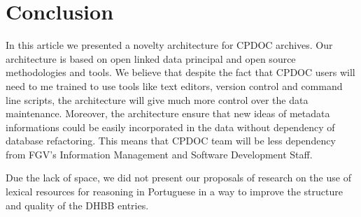 \documentclass{llncs}
\begin{document}


\section{Conclusion}

In this article we presented a novelty architecture for CPDOC
archives. Our architecture is based on open linked data principal and
open source methodologies and tools. We believe that despite the fact
that CPDOC users will need to me trained to use tools like text
editors, version control and command line scripts, the architecture
will give much more control over the data maintenance. Moreover, the
architecture ensure that new ideas of metadata informations could be
easily incorporated in the data without dependency of database
refactoring. This means that CPDOC team will be less dependency from
FGV's Information Management and Software Development Staff.

Due the lack of space, we did not present our proposals of research on
the use of lexical resources for reasoning in Portuguese in a way to
improve the structure and quality of the DHBB entries.



\end{document}

